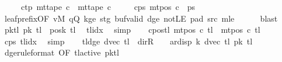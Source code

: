 \begin{isabellebody}
\ \ \ \ \ c{}{\isacharunderscore}{\kern0pt}tp{\isacharcolon}{\kern0pt}\ {\isachardoublequoteopen}mt{\isacharunderscore}{\kern0pt}tape\ c{}\ {\isacharequal}{\kern0pt}\ mt{\isacharunderscore}{\kern0pt}tape\ c{}{\isachardoublequoteclose}\isanewline
\ \ \ \ \ c{}{\isacharunderscore}{\kern0pt}ps{\isacharcolon}{\kern0pt}\ {\isachardoublequoteopen}mt{\isacharunderscore}{\kern0pt}pos\ c{}\ {\isacharequal}{\kern0pt}\ {\isacharquery}{\kern0pt}ps{\isachardoublequoteclose}\isanewline
\ \ \ \ \isamarkupfalse%
\ leaf{\isacharunderscore}{\kern0pt}prefix{\isacharbrackleft}{\kern0pt}OF\ vM\ qQ\ kge{}\ stg{}\ buf{\isacharunderscore}{\kern0pt}valid\ dge{}\ notLE\ pad{}\ src{}\ m{}le{\isacharbrackright}{\kern0pt}\isanewline
\ \ \ \ \isamarkupfalse%
\ blast\isanewline
\ \ \isamarkupfalse%
\ pk{\isacharunderscore}{\kern0pt}tl{\isacharcolon}{\kern0pt}\ {\isachardoublequoteopen}{\isacharquery}{\kern0pt}pk\ {\isacharquery}{\kern0pt}tl\ {\isacharequal}{\kern0pt}\ posk{}\ {\isacharquery}{\kern0pt}tl{\isachardoublequoteclose}\ \isamarkupfalse%
\ tlidx\ \isamarkupfalse%
\ simp\isanewline
\ \ \isamarkupfalse%
\ c{}{\isacharunderscore}{\kern0pt}pos{\isacharunderscore}{\kern0pt}tl{\isacharcolon}{\kern0pt}\ {\isachardoublequoteopen}mt{\isacharunderscore}{\kern0pt}pos\ c{}\ {\isacharquery}{\kern0pt}tl\ {\isacharequal}{\kern0pt}\ mt{\isacharunderscore}{\kern0pt}pos\ c{}\ {\isacharquery}{\kern0pt}tl{\isachardoublequoteclose}\ \isamarkupfalse%
\ c{}{\isacharunderscore}{\kern0pt}ps\ tlidx\ \isamarkupfalse%
\ simp\isanewline
\ \ \isamarkupfalse%
\ tl{\isacharunderscore}{\kern0pt}dge{}{\isacharcolon}{\kern0pt}\ {\isachardoublequoteopen}dvec\ {\isacharquery}{\kern0pt}tl\ {\isasymnoteq}\ dir{\isachardot}{\kern0pt}R\ {\isasymLongrightarrow}\ {}\ {\isacharless}{\kern0pt}\ ar{\isacharunderscore}{\kern0pt}disp\ {\isacharquery}{\kern0pt}k\ {\isacharparenleft}{\kern0pt}dvec\ {\isacharquery}{\kern0pt}tl{\isacharparenright}{\kern0pt}\ {\isacharparenleft}{\kern0pt}{\isacharquery}{\kern0pt}pk\ {\isacharquery}{\kern0pt}tl{\isacharparenright}{\kern0pt}{\isachardoublequoteclose}\isanewline
\ \ \ \ \isamarkupfalse%
\ dge{}{\isacharbrackleft}{\kern0pt}rule{\isacharunderscore}{\kern0pt}format{\isacharcomma}{\kern0pt}\ OF\ tl{\isacharunderscore}{\kern0pt}active{\isacharbrackright}{\kern0pt}\ pk{\isacharunderscore}{\kern0pt}tl\ \isamarkupfalse%

\end{isabellebody}
